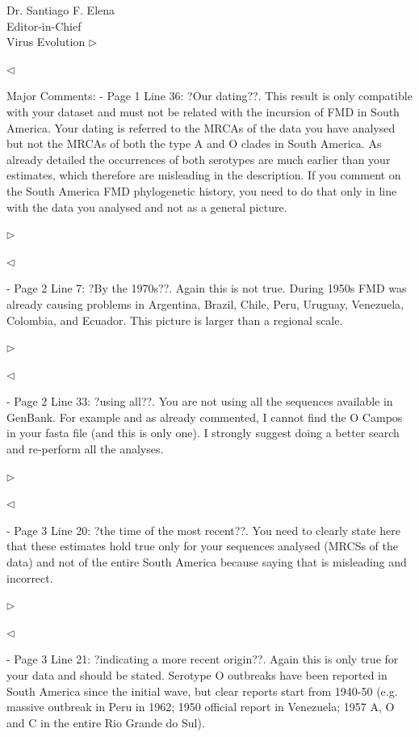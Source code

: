 \documentclass[ucla,biomath,12pt,noaddrfooter,datefrom]{UC_letter}
\newenvironment{reply}{$\triangleright$\bf}{$\triangleleft$}
\begin{document}
\begin{letter}{
Dr. Santiago F. Elena \\
Editor-in-Chief \\
Virus Evolution
}
\begin{reply}

\end{reply}

Major Comments:
-       Page 1 Line 36: ?Our dating??. 
This result is only compatible with your dataset and must not be related with the incursion of FMD in South America. 
Your dating is referred to the MRCAs of the data you have analysed but not the MRCAs of both the type A and O clades in South America. 
As already detailed the occurrences of both serotypes are much earlier than your estimates, which therefore are misleading in the description. 
If you comment on the South America FMD phylogenetic history, you need to do that only in line with the data you analysed and not as a general picture.

\begin{reply}

\end{reply}

-       Page 2 Line 7: ?By the 1970s??. 
Again this is not true. 
During 1950s FMD was already causing problems in Argentina, Brazil, Chile, Peru, Uruguay, Venezuela, Colombia, and Ecuador. 
This picture is larger than a regional scale.

\begin{reply}

\end{reply}

-       Page 2 Line 33: ?using all??. 
You are not using all the sequences available in GenBank. 
For example and as already commented, I cannot find the O Campos in your fasta file (and this is only one). 
I strongly suggest doing a better search and re-perform all the analyses.

\begin{reply}

\end{reply}

-       Page 3 Line 20: ?the time of the most recent??. 
You need to clearly state here that these estimates hold true only for your sequences analysed (MRCSs of the data) and not of the entire South America because saying that is misleading and incorrect.

\begin{reply}

\end{reply}

-       Page 3 Line 21: ?indicating a more recent origin??. 
Again this is only true for your data and should be stated. 
Serotype O outbreaks have been reported in South America since the initial wave, but clear reports start from 1940-50 (e.g. massive outbreak in Peru in 1962; 1950 official report in Venezuela; 1957 A, O and C in the entire Rio Grande do Sul).


\end{letter}
\end{document}
